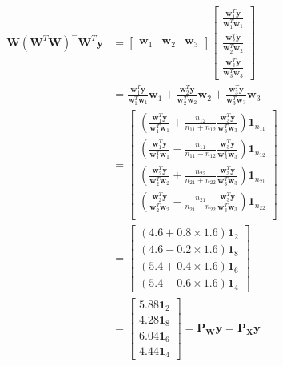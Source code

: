 \documentclass{article}
\begin{document}
\begin{enumerate}[leftmargin = 0 em, label = \arabic*., font = \bfseries]
\begin{enumerate}
 	\begin{align*}
 	\bm W (\bm W^T \bm W)^- \bm W^T \bm y & = \begin{bmatrix}
 		\bm w_1 & \bm w_2 & \bm w_3
 	\end{bmatrix} \begin{bmatrix}
 		\frac{\bm w_1^T \bm y}{\bm w_1^T \bm w_1}\\
 		\frac{\bm w_2^T \bm y}{\bm w_2^T \bm w_2}\\
 		\frac{\bm w_3^T \bm y}{\bm w_3^T \bm w_3}
 	\end{bmatrix} \\
 	& = \frac{\bm w_1^T \bm y}{\bm w_1^T \bm w_1} \bm w_1 + \frac{\bm w_2^T \bm y}{\bm w_2^T \bm w_2} \bm w_2 + \frac{\bm w_3^T \bm y}{\bm w_3^T \bm w_3} \bm w_3\\
 	& = \begin{bmatrix}
 		\left( \frac{\bm w_1^T \bm y}{\bm w_1^T \bm w_1} + \frac{n_{12}}{n_{11} + n_{12}} \frac{\bm w_3^T \bm y}{\bm w_3^T \bm w_3}  \right) \bm 1_{n_{11}}\\
 		\left( \frac{\bm w_1^T \bm y}{\bm w_1^T \bm w_1} - \frac{n_{11}}{n_{11} - n_{12}} \frac{\bm w_3^T \bm y}{\bm w_3^T \bm w_3}  \right) \bm 1_{n_{12}}\\
 		\left( \frac{\bm w_2^T \bm y}{\bm w_2^T \bm w_2} + \frac{n_{22}}{n_{21} + n_{22}} \frac{\bm w_3^T \bm y}{\bm w_3^T \bm w_3}  \right) \bm 1_{n_{21}}\\
 		\left( \frac{\bm w_2^T \bm y}{\bm w_2^T \bm w_2} - \frac{n_{21}}{n_{21} - n_{22}} \frac{\bm w_3^T \bm y}{\bm w_3^T \bm w_3}  \right) \bm 1_{n_{22}}\\
 	\end{bmatrix}\\
 	& = \begin{bmatrix}
 			(4.6 + 0.8 \times 1.6) \bm 1_{2}\\
 			(4.6 - 0.2 \times 1.6) \bm 1_{8}\\
 			(5.4 + 0.4 \times 1.6) \bm 1_{6}\\
 			(5.4 - 0.6 \times 1.6) \bm 1_{4}
 		\end{bmatrix}\\
 		& = \begin{bmatrix}
 			5.88 \bm 1_{2}\\
 			4.28 \bm 1_{8}\\
 			6.04 \bm 1_{6}\\
 			4.44 \bm 1_{4}
 		\end{bmatrix} = \bm P_{\bm W} \bm y = \bm P_{\bm X} \bm y
 	\end{align*}


\end{enumerate}
\end{enumerate}
\end{document}
